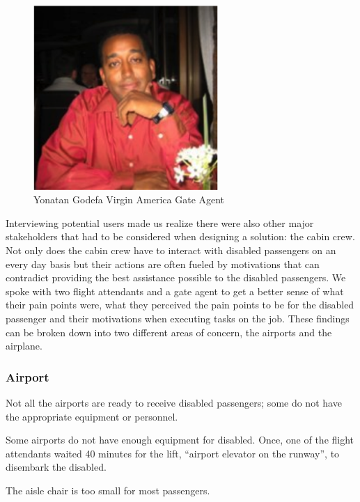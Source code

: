 \documentclass[a4paper, 12pt,conference]{new_cit_thesis}
\begin{document}
\begin{figure}[h]
  \centering
     \includegraphics[width=7cm]{images/image031}
   \caption{Yonatan Godefa Virgin America Gate Agent}
  \label{fig:31}
\end{figure}

Interviewing potential users made us realize there were also other major stakeholders that had to be considered when designing a solution: the cabin crew. Not only does the cabin crew have to interact with disabled passengers on an every day basis but their actions are often fueled by motivations that can contradict providing the best assistance possible to the disabled passengers. We spoke with two flight attendants and a gate agent to get a better sense of what their pain points were, what they perceived the pain points to be for the disabled passenger and their motivations when executing tasks on the job. These findings can be broken down into two different areas of concern, the airports and the airplane. 

\subsubsection{Airport}
\begin{list}{-}{}
  \item Not all the airports are ready to receive disabled passengers; some do not have the appropriate equipment or personnel.
  \item Some airports do not have enough equipment for disabled. Once, one of the flight attendants waited 40 minutes for the lift, “airport elevator on the runway”, to disembark the disabled.
  \item The aisle chair is too small for most passengers.
\end{list}
\end{document}
